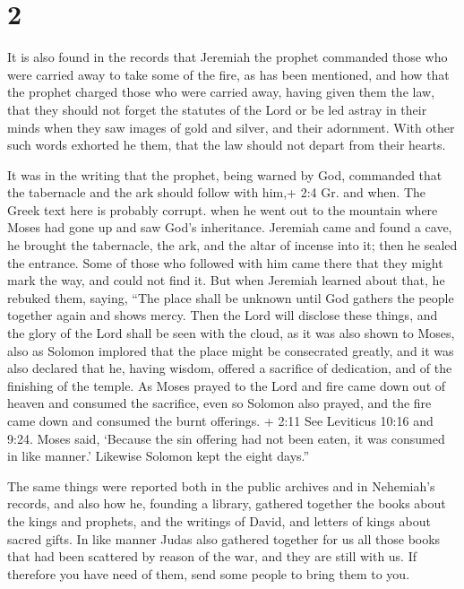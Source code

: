 \hypertarget{section-1}{%
\section{2}\label{section-1}}

 It is also found in the records that Jeremiah the prophet
commanded those who were carried away to take some of the fire, as has
been mentioned,  and how that the prophet charged those who
were carried away, having given them the law, that they should not
forget the statutes of the Lord or be led astray in their minds when
they saw images of gold and silver, and their adornment. 
With other such words exhorted he them, that the law should not depart
from their hearts.

 It was in the writing that the prophet, being warned by
God, commanded that the tabernacle and the ark should follow with him,+
2:4 Gr. and when. The Greek text here is probably corrupt. when he went
out to the mountain where Moses had gone up and saw God's inheritance.
 Jeremiah came and found a cave, he brought the tabernacle,
the ark, and the altar of incense into it; then he sealed the entrance.
 Some of those who followed with him came there that they
might mark the way, and could not find it.  But when
Jeremiah learned about that, he rebuked them, saying, ``The place shall
be unknown until God gathers the people together again and shows mercy.
 Then the Lord will disclose these things, and the glory of
the Lord shall be seen with the cloud, as it was also shown to Moses,
also as Solomon implored that the place might be consecrated greatly,
 and it was also declared that he, having wisdom, offered a
sacrifice of dedication, and of the finishing of the temple.
 As Moses prayed to the Lord and fire came down out of
heaven and consumed the sacrifice, even so Solomon also prayed, and the
fire came down and consumed the burnt offerings.  + 2:11
See Leviticus 10:16 and 9:24. Moses said, `Because the sin offering had
not been eaten, it was consumed in like manner.'  Likewise
Solomon kept the eight days.''

 The same things were reported both in the public archives
and in Nehemiah's records, and also how he, founding a library, gathered
together the books about the kings and prophets, and the writings of
David, and letters of kings about sacred gifts.  In like
manner Judas also gathered together for us all those books that had been
scattered by reason of the war, and they are still with us.
 If therefore you have need of them, send some people to
bring them to you.

